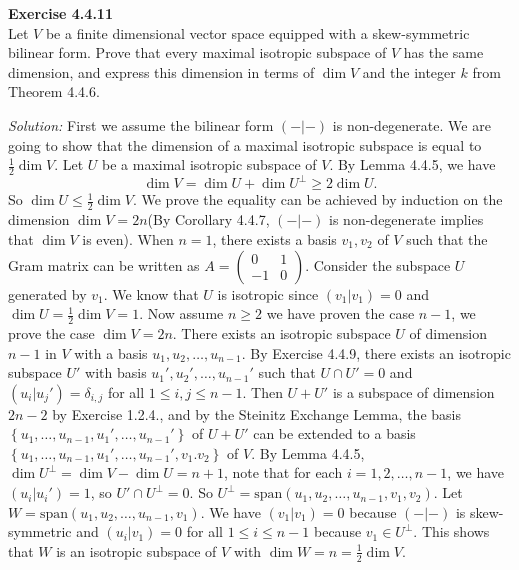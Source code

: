 \documentclass[a4paper, 12pt]{article}
\newenvironment{problem}[2][Exercise]
    { \begin{mdframed}[backgroundcolor=gray!20] \textbf{#1 #2} \\}
    {  \end{mdframed}}
\newenvironment{solution}
    {\textit{Solution:}}
    {}
\begin{document}
\begin{problem}{4.4.11}
Let \(V\) be a finite dimensional vector space equipped with a skew-symmetric bilinear form. Prove that every maximal isotropic subspace of \(V\) has the same dimension, and express 
this dimension in terms of \(\dim V\) and the integer \(k\) from Theorem 4.4.6.
\end{problem}
\begin{solution}
First we assume the bilinear form \((-|-)\) is non-degenerate. We are going to show that the dimension of a maximal isotropic subspace is equal to \(\frac{1}{2}\dim V\). Let \(U\) be a maximal isotropic subspace of \(V\). By Lemma 4.4.5, we have 
\[\dim V=\dim U+\dim U^\perp\geq 2\dim U.\]
So \(\dim U\leq \frac{1}{2}\dim V\). We prove the equality can be achieved by induction on the dimension \(\dim V=2n\)(By Corollary 4.4.7, \((-|-)\) is non-degenerate implies that \(\dim V\) is even). When \(n=1\), there exists a basis \(v_1,v_2\) of \(V\) such that the Gram 
matrix can be written as \(A=\begin{pmatrix}
	0 & 1\\ 
	-1 &0
\end{pmatrix}\). Consider the subspace \(U\) generated by \(v_1\). We know that \(U\) is isotropic since \((v_1|v_1)=0\) and \(\dim U=\frac{1}{2}\dim V=1\). Now assume \(n\geq 2\) we have proven the case \(n-1\), we prove the case \(\dim V=2n\). There exists an isotropic subspace \(U\) of dimension \(n-1\) 
in \(V\) with a basis \(u_1,u_2,\ldots,u_{n-1}\). By Exercise 4.4.9, there exists an isotropic subspace \(U'\) with basis \(u_1',u_2',\ldots,u_{n-1}'\) such that \(U\cap U'=0\) and \((u_i|u_j')=\delta_{i,j}\) for all \(1\leq i,j\leq n-1\). Then \(U+ U'\) is a subspace of dimension 
\(2n-2\) by Exercise 1.2.4., and by the Steinitz Exchange Lemma, the basis \(\left\{ u_1,\ldots,u_{n-1},u_1',\ldots,u_{n-1}' \right\}\) of \(U+U'\) can be extended to a basis 
\(\left\{ u_1,\ldots,u_{n-1},u_1',\ldots,u_{n-1}',v_1.v_2 \right\}\) of \(V\). By Lemma 4.4.5, \(\dim U^\perp=\dim V-\dim U=n+1\), note that for each \(i=1,2,\ldots,n-1\), we have \((u_i|u_i')=1\), so \(U'\cap U^\perp=0\). So 
\(U^\perp=\text{span}(u_1,u_2,\ldots,u_{n-1},v_1,v_2)\). Let \(W=\text{span}(u_1,u_2,\ldots,u_{n-1},v_1)\). We have \((v_1|v_1)=0\) because \((-|-)\) is skew-symmetric and \((u_i|v_1)=0\) for all \(1\leq i\leq n-1\) because \(v_1\in U^\perp\). This shows that \(W\) is an isotropic subspace of \(V\) with \(\dim W=n=\frac{1}{2}\dim V\).

\end{solution}
\end{document}
